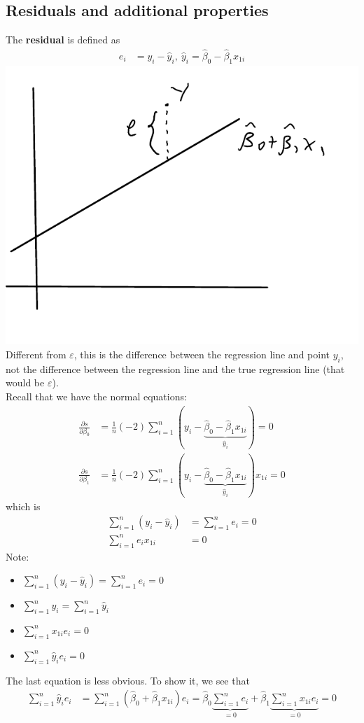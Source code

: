 \documentclass[12 pt]{article}
\begin{document}
\subsection{Residuals and additional properties}
The \textbf{residual} is defined as
\begin{align*}
  e_i & = y_i - \hat{y}_i,\ \hat{y}_i = \hat{\beta}_0 - \hat{\beta}_1 x_{1i}
\end{align*}
\includegraphics[width=.6\textwidth]{12.pdf}\\
Different from $\varepsilon$, this is the difference between the
regression line and point $y_i$, not the difference between the
regression line and the true regression line (that would be
$\varepsilon$).
\\ Recall that we have the normal equations:
\begin{align*}
  \frac{\partial{s}}{\partial{\beta_0}} & = \frac{1}{n}(-2) \sum_{i=1}^n (y_i - \underbrace{\hat{\beta}_0 - \hat{\beta}_1x_{1i}}_{\hat{y}_i}) = 0
  \\ \frac{\partial{s}}{\partial{\beta_1}} & = \frac{1}{n}(-2) \sum_{i=1}^n (y_i - \underbrace{\hat{\beta}_0 - \hat{\beta}_1x_{1i}}_{\hat{y}_i})x_{1i} = 0
\end{align*}
which is
\begin{align*}
  \sum_{i=1}^n(y_i - \hat{y}_i) & = \sum_{i=1}^ne_i =  0
  \\ \sum_{i=1}^n e_i x_{1i} & = 0
\end{align*}
Note:
\begin{itemize}
\item
  $\sum_{i=1}^n(y_i - \hat{y}_i) = \sum_{i=1}^ne_i =  0$
\item $\sum_{i=1}^n y_i = \sum_{i=1}^n \hat{y}_i$
\item $\sum_{i=1}^n x_{1i}e_i = 0$
\item $\sum_{i=1}^n \hat{y}_i e_i = 0$
\end{itemize}
The last equation is less obvious. To show it, we see that
\begin{align*}
  \sum_{i=1}^n \hat{y}_i e_i & = \sum_{i=1}^n (\hat{\beta}_0 + \hat{\beta}_1 x_{1i})e_{i} = \hat{\beta}_0 \underbrace{\sum_{i=1}^n e_i}_{=0} + \hat{\beta}_1 \underbrace{\sum_{i=1}^n x_{1i} e_i}_{=0}
  = 0
\end{align*}
\end{document}
